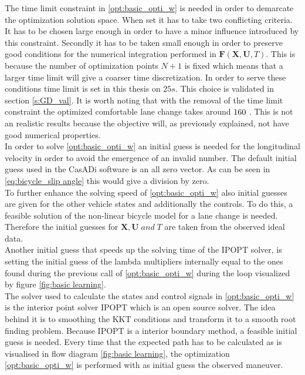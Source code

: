 The time limit constraint in \ref{opt:basic_opti_w} is needed in order to demarcate the optimization solution space. When set it has to take two conflicting criteria. It has to be chosen large enough in order to have a minor influence introduced by this constraint. Secondly it has to be taken small enough in order to preserve good conditions for the numerical integration performed in $\bm{F}(\bm{X},\bm{U}, T)$. This is because the number of optimization points $N+1$ is fixed which means that a larger time limit will give a coarser time discretization. In order to serve these conditions time limit is set in this thesis on $25 s$. This choice is validated in section \ref{s:GD_val}. It is worth noting that with the removal of the time limit constraint the optimized comfortable lane change takes around $160 \hspace{1mm}$. This is not an realistic results because the objective will, as previously explained, not have good numerical properties.\\ 

In order to solve \ref{opt:basic_opti_w} an initial guess is needed for the longitudinal velocity in order to avoid the emergence of an invalid number. The default initial guess used in the CasADi software is an all zero vector. As can be seen in \ref{eq:bicycle_slip angle} this would give a division by zero. \\
To further enhance the solving speed of \ref{opt:basic_opti_w} also initial guesses are given for the other vehicle states and additionally the controls. To do this, a feasible solution of the non-linear bicycle model for a lane change is needed. Therefore the initial guesses for $\bm{X}, \bm{U} \;and\; T$ are taken from the observed ideal data. \\

Another initial guess that speeds up the solving time of the IPOPT solver, is setting the initial guess of the lambda multipliers internally equal to the ones found during the previous call of \ref{opt:basic_opti_w} during the loop visualized by figure \ref{fig:basic learning}. \\

The solver used to calculate the states and control signals in \ref{opt:basic_opti_w} is the interior point solver IPOPT which is an open source solver. The idea behind it is to smoothing the KKT conditions and transform it to a smooth root finding problem. \cite{Panos_opti} Because IPOPT is a interior boundary method, a feasible initial guess is needed. Every time that the expected path has to be calculated as is visualised in flow diagram \ref{fig:basic learning}, the optimization \ref{opt:basic_opti_w} is performed with as initial guess the observed maneuver.\\

